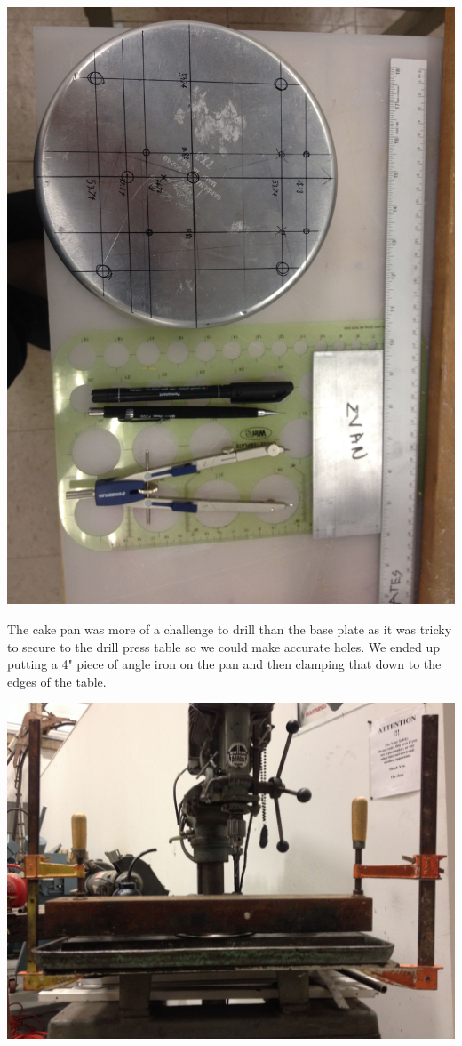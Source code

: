\documentclass[11pt]{article} %
\begin{document}
\begin{center}
\includegraphics[scale=0.11]{feed/04.jpeg}
\end{center}

The cake pan was more of a challenge to drill than the base plate as it was tricky to secure to the drill press table so we could make accurate holes. We ended up putting a 4" piece of angle iron on the pan and then clamping that down to the edges of the table. 

\begin{center}
\includegraphics[scale=0.15]{feed/05.jpeg}
\end{center}
\end{document}
